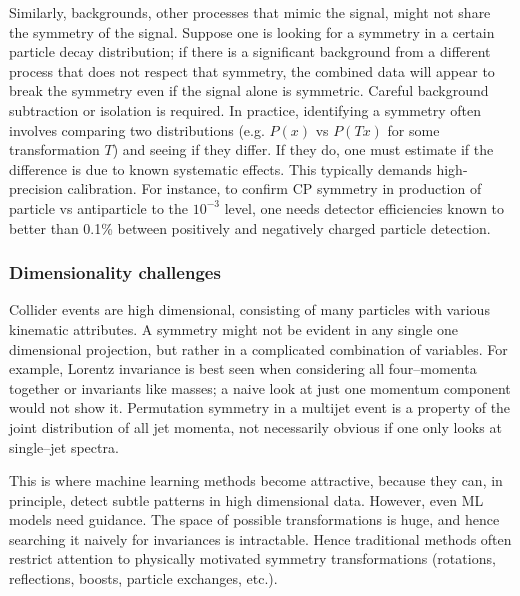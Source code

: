         Similarly, backgrounds, other processes that mimic the signal, might not share the symmetry of the signal.
        Suppose one is looking for a symmetry in a certain particle decay distribution; if there is a significant background from a different process that does not respect that symmetry, the combined data will appear to break the symmetry even if the signal alone is symmetric.
        Careful background subtraction or isolation is required.
        In practice, identifying a symmetry often involves comparing two distributions (e.g. $P(x)$ vs $P(Tx)$ for some transformation $T$) and seeing if they differ. If they do, one must estimate if the difference is due to known systematic effects.
        This typically demands high-precision calibration.
        For instance, to confirm CP symmetry in production of particle vs antiparticle to the $10^{-3}$ level, one needs detector efficiencies known to better than 0.1\% between positively and negatively charged particle detection.

        \subsubsection{Dimensionality challenges}
            Collider events are high dimensional, consisting of many particles with various kinematic attributes.
            A symmetry might not be evident in any single one dimensional projection, but rather in a complicated combination of variables.
            For example, Lorentz invariance is best seen when considering all four--momenta together or invariants like masses; a naive look at just one momentum component would not show it.
            Permutation symmetry in a multijet event is a property of the joint distribution of all jet momenta, not necessarily obvious if one only looks at single--jet spectra.
           
            This is where machine learning methods become attractive, because they can, in principle, detect subtle patterns in high dimensional data.
            However, even ML models need guidance.
            The space of possible transformations is huge, and hence searching it naively for invariances is intractable.
            Hence traditional methods often restrict attention to physically motivated symmetry transformations (rotations, reflections, boosts, particle exchanges, etc.).

